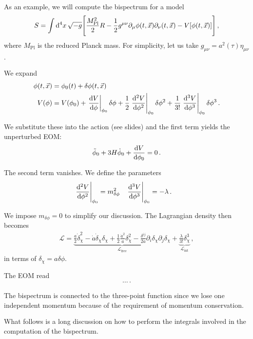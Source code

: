 \documentclass[main.tex]{subfiles}
\begin{document}
As an example, we will compute the bispectrum for a model 
%
\begin{align}
S = \int \dd[4]{x} \sqrt{-g}
\qty[ \frac{M _{\text{Pl}}^2}{2} R 
- \frac{1}{2} g^{\mu \nu } \partial_{\mu } \phi (t, \vec{x}) \partial_{\nu } (t, \vec{x}) 
- V[\phi (t, \vec{x})]]
\,,
\end{align}
%
where \(M _{\text{Pl}}\) is the reduced Planck mass. 
For simplicity, let us take \(g_{\mu \nu } = a^2(\tau) \eta _{\mu \nu }\).

We expand 
%
\begin{align}
\phi (t, \vec{x}) &= \phi_0 (t) + \delta \phi (t, \vec{x})  \\
V(\phi ) &= V(\phi_0 ) 
+ \eval{\dv{V}{\phi }}_{\phi_0 } \delta \phi 
+ \frac{1}{2} \eval{\dv[2]{V}{\phi }}_{\phi_0 } \delta \phi^2  
+ \frac{1}{3!} \eval{\dv[3]{V}{\phi }}_{\phi_0 } \delta \phi^3  
\,.
\end{align}

We substitute these into the action (see slides) and the first term yields the unperturbed EOM: 
%
\begin{align}
\ddot{\phi}_0 + 3 H \dot{\phi}_0 + \dv{V}{\phi_0 } = 0
\,.
\end{align}

The second term vanishes.
We define the parameters 
%
\begin{align}
\eval{\dv[2]{V}{\phi}}_{\phi_0 } &= m_{ \delta \phi}^2 &
\eval{\dv[3]{V}{\phi}}_{\phi_0 } &= - \lambda  
\,.
\end{align}

We impose \(m_{ \delta \phi } = 0\) to simplify our discussion.
The Lagrangian density then becomes 
%
\begin{align}
\mathcal{L} = \underbrace{\frac{a}{2} \dot{\delta}_\chi^2
- \dot{a} \dot{\delta}_\chi \delta_\chi 
+ \frac{1}{2} \frac{\dot{a}^2}{a} \delta_{ \chi  }^2
- \frac{\delta^{ij}}{2a} \partial_{i} \delta _\chi \partial_{j} \delta _\chi }_{\mathcal{L} _{\text{free}}}
+ \underbrace{\frac{\lambda}{3!} \delta_\chi^3}_{\mathcal{L} _{\text{int}}}
\,,
\end{align}
%
in terms of \(\delta _\chi = a \delta \phi \). 

The EOM read
%
\begin{align}
\dots
\,.
\end{align}

The bispectrum is connected to the three-point function since we lose one independent momentum because of the requirement of momentum conservation. 

What follows is a long discussion on how to perform the integrals involved in the computation of the bispectrum.
\end{document}
